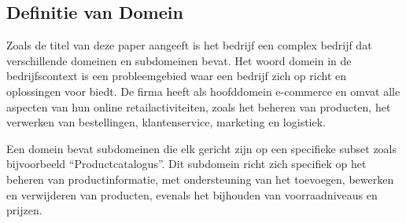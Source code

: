 





\bigskip
 
\subsection{Definitie van Domein}
Zoals de titel van deze paper aangeeft is het bedrijf een complex bedrijf dat verschillende domeinen en subdomeinen bevat.
Het woord domein in de bedrijfscontext is een probleemgebied waar een bedrijf zich op richt en oplossingen voor biedt. 
De firma heeft als hoofddomein e-commerce en omvat alle aspecten van hun online retailactiviteiten, 
zoals het beheren van producten, het verwerken van bestellingen, klantenservice, marketing en logistiek.
\newline 

Een domein bevat subdomeinen die elk gericht zijn op een specifieke subset zoals bijvoorbeeld ``Productcatalogus''.
Dit subdomein richt zich specifiek op het beheren van productinformatie, met ondersteuning van het toevoegen, bewerken en verwijderen van producten, 
evenals het bijhouden van voorraadniveaus en prijzen.
\newline 

